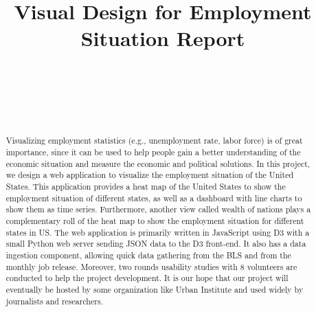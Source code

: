 \documentclass{sigchi}
\begin{document}
\title{Visual Design for Employment Situation Report}

\author{%
  \\
  \\
  \\
  \\
}

\maketitle

\begin{abstract}
Visualizing employment statistics (e.g., unemployment rate, labor force) is of great importance, since it can be used to help people gain a better understanding of  the economic situation and measure the economic and political solutions. In this project, we design a web application to visualize the employment situation of the United States. This application provides a heat map of the United States to show the employment situation of different states, as well as a dashboard with line charts to show them as time series. Furthermore, another view called wealth of nations plays a complementary roll of the heat map to show the employment situation for different states in US. The web application is primarily written in JavaScript using D3 with a small Python web server sending JSON data to the D3 front-end. It also has a data ingestion component, allowing quick data gathering from the BLS and from the monthly job release. Moreover, two rounds usability studies with 8 volunteers are conducted to help the project development. It is our hope that our project will eventually be hosted by some organization like Urban Institute and used widely by journalists and researchers.
\end{abstract}
\end{document}
